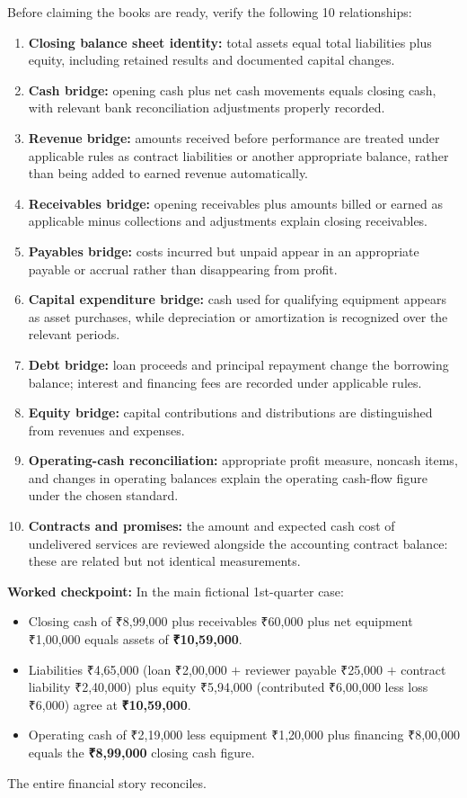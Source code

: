 Before claiming the books are ready, verify the following 10 relationships:
\begin{enumerate}
\item \textbf{Closing balance sheet identity:} total assets equal total liabilities plus equity, including retained results and documented capital changes.
\item \textbf{Cash bridge:} opening cash plus net cash movements equals closing cash, with relevant bank reconciliation adjustments properly recorded.
\item \textbf{Revenue bridge:} amounts received before performance are treated under applicable rules as contract liabilities or another appropriate balance, rather than being added to earned revenue automatically.
\item \textbf{Receivables bridge:} opening receivables plus amounts billed or earned as applicable minus collections and adjustments explain closing receivables.
\item \textbf{Payables bridge:} costs incurred but unpaid appear in an appropriate payable or accrual rather than disappearing from profit.
\item \textbf{Capital expenditure bridge:} cash used for qualifying equipment appears as asset purchases, while depreciation or amortization is recognized over the relevant periods.
\item \textbf{Debt bridge:} loan proceeds and principal repayment change the borrowing balance; interest and financing fees are recorded under applicable rules.
\item \textbf{Equity bridge:} capital contributions and distributions are distinguished from revenues and expenses.
\item \textbf{Operating-cash reconciliation:} appropriate profit measure, noncash items, and changes in operating balances explain the operating cash-flow figure under the chosen standard.
\item \textbf{Contracts and promises:} the amount and expected cash cost of undelivered services are reviewed alongside the accounting contract balance: these are related but not identical measurements.
\end{enumerate}

\textbf{Worked checkpoint:} In the main fictional 1st-quarter case:
\begin{itemize}
\item Closing cash of ₹8,99,000 plus receivables ₹60,000 plus net equipment ₹1,00,000 equals assets of \textbf{₹10,59,000}.
\item Liabilities ₹4,65,000 (loan ₹2,00,000 $+$ reviewer payable ₹25,000 $+$ contract liability ₹2,40,000) plus equity ₹5,94,000 (contributed ₹6,00,000 less loss ₹6,000) agree at \textbf{₹10,59,000}.
\item Operating cash of ₹2,19,000 less equipment ₹1,20,000 plus financing ₹8,00,000 equals the \textbf{₹8,99,000} closing cash figure.
\end{itemize}
The entire financial story reconciles.


